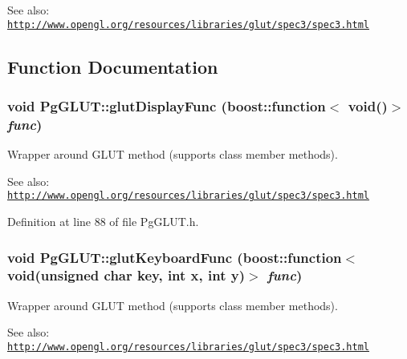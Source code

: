 \begin{Desc}
\item[See also:]\href{http://www.opengl.org/resources/libraries/glut/spec3/spec3.html}{\tt http://www.opengl.org/resources/libraries/glut/spec3/spec3.html} \end{Desc}


\subsection{Function Documentation}
\hypertarget{namespace_pg_g_l_u_t_fc9d60400e5bf6641d101f320c9019b6}{
\subsubsection[glutDisplayFunc]{\setlength{\rightskip}{0pt plus 5cm}void PgGLUT::glutDisplayFunc (boost::function$<$ void()$>$ {\em func})}}
\label{namespace_pg_g_l_u_t_fc9d60400e5bf6641d101f320c9019b6}


Wrapper around GLUT method (supports class member methods). 

\begin{Desc}
\item[See also:]\href{http://www.opengl.org/resources/libraries/glut/spec3/spec3.html}{\tt http://www.opengl.org/resources/libraries/glut/spec3/spec3.html} \end{Desc}


Definition at line 88 of file PgGLUT.h.\hypertarget{namespace_pg_g_l_u_t_de5fa3bf06d851c9de6cf23052710fde}{
\subsubsection[glutKeyboardFunc]{\setlength{\rightskip}{0pt plus 5cm}void PgGLUT::glutKeyboardFunc (boost::function$<$ void(unsigned char key, int x, int y)$>$ {\em func})}}
\label{namespace_pg_g_l_u_t_de5fa3bf06d851c9de6cf23052710fde}


Wrapper around GLUT method (supports class member methods). 

\begin{Desc}
\item[See also:]\href{http://www.opengl.org/resources/libraries/glut/spec3/spec3.html}{\tt http://www.opengl.org/resources/libraries/glut/spec3/spec3.html} \end{Desc}


